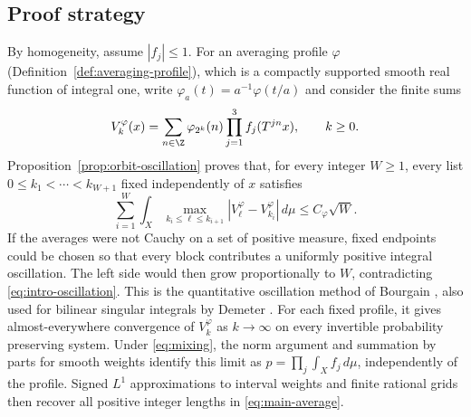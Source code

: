 \subsection{Proof strategy}

By homogeneity, assume $|f_j|\leq1$.  For an averaging profile $\varphi$
(Definition~\ref{def:averaging-profile}), which is a compactly supported
smooth real function of integral one, write
$\varphi_a(t)=a^{-1}\varphi(t/a)$ and consider the finite sums
\[
 V_k^\varphi(x)=\sum_{n\in\Z}\varphi_{2^k}(n)
           \prod_{j=1}^3 f_j(T^{jn}x),\qquad k\ge0.
\]
Proposition~\ref{prop:orbit-oscillation} proves that, for every integer
$W\geq1$, every list $0\le k_1<\cdots<k_{W+1}$ fixed independently of
$x$ satisfies
\begin{equation}
 \sum_{i=1}^W\int_X
    \max_{k_i\le\ell\le k_{i+1}}
        |V_\ell^\varphi-V_{k_i}^\varphi|\,d\mu
 \le C_\varphi\sqrt W.
 \label{eq:intro-oscillation}
\end{equation}
If the averages were not Cauchy on a set of positive measure, fixed endpoints
could be chosen so that every block contributes a uniformly positive integral
oscillation.  The left side would then grow proportionally to $W$, contradicting
\eqref{eq:intro-oscillation}.  This is the quantitative oscillation method
of Bourgain \cite[Section~2C]{Bourgain1989}, also used for bilinear singular
integrals by Demeter \cite{Demeter2007}.  For each fixed profile, it gives
almost-everywhere convergence of $V_k^\varphi$ as $k\to\infty$ on every
invertible probability preserving system.  Under \eqref{eq:mixing}, the norm
argument and summation by parts for smooth weights identify this limit as
$p=\prod_j\int_X f_j\,d\mu$, independently of the profile.  Signed $L^1$
approximations to interval weights and finite rational grids then recover
all positive integer lengths in \eqref{eq:main-average}.


